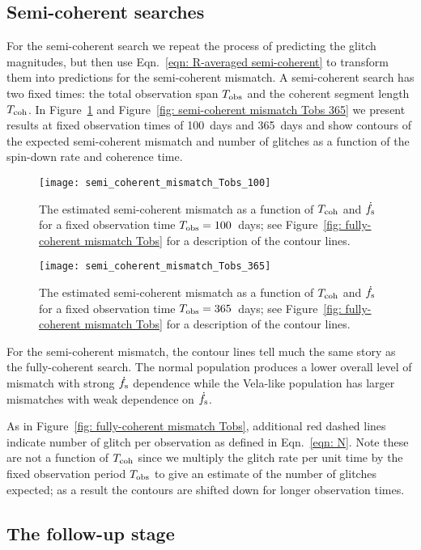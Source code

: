 \documentclass[../full_thesis/full_thesis.tex]{subfiles}
\begin{document}
\subsection{Semi-coherent searches}

For the semi-coherent search we repeat the process of predicting the glitch
magnitudes, but then use Eqn.~\eqref{eqn: R-averaged semi-coherent} to
transform them into predictions for the semi-coherent mismatch. A semi-coherent search has two
fixed times: the total observation span $T_{\mathrm{obs}}$ and the coherent segment length
$T_{\mathrm{coh}}$. In Figure~\ref{fig: semi-coherent mismatch Tobs 100} and Figure~\ref{fig:
semi-coherent mismatch Tobs 365} we present results at fixed observation times
of 100~days and 365~days and show contours of the expected semi-coherent mismatch and number
of glitches as a function of the spin-down rate and coherence time.
\begin{figure}
\centering
\texttt{[image: semi\_coherent\_mismatch\_Tobs\_100]}
\caption{
The estimated semi-coherent mismatch as a function of $T_{\mathrm{coh}}$ and $\dot{f}_{\textrm{s}}$ for
a fixed observation time $T_{\mathrm{obs}}=100$~days; see Figure~\ref{fig: fully-coherent
mismatch Tobs} for a description of the contour lines.}
\label{fig: semi-coherent mismatch Tobs 100}
\end{figure}
\begin{figure}
\centering
\texttt{[image: semi\_coherent\_mismatch\_Tobs\_365]}
\caption{
The estimated semi-coherent mismatch as a function of $T_{\mathrm{coh}}$ and $\dot{f}_{\textrm{s}}$ for
a fixed observation time $T_{\mathrm{obs}}=365$~days; see Figure~\ref{fig: fully-coherent
mismatch Tobs} for a description of the contour lines.}
\label{fig: semi-coherent mismatch Tobs 365}
\end{figure}

For the semi-coherent mismatch, the contour lines tell much the same story as
the fully-coherent search. The normal population produces a lower overall level of
mismatch with strong $\dot{f}_{\textrm{s}}$ dependence while the Vela-like population has
larger mismatches with weak dependence on $\dot{f}_{\textrm{s}}$.

As in Figure~\ref{fig: fully-coherent mismatch Tobs}, additional red dashed lines
indicate  number of glitch per observation as defined in Eqn.~\eqref{eqn: N}.
Note these are not a function of $T_{\mathrm{coh}}$ since we multiply the glitch rate per
unit time by the fixed observation period $T_{\mathrm{obs}}$ to give an estimate of the
number of glitches expected; as a result the contours are shifted down for
longer observation times.

\subsection{The follow-up stage}
\end{document}
